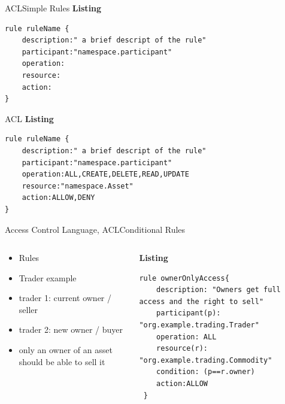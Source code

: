 \documentclass[pdf,table]{beamer}
\begin{document}
\begin{frame}[fragile]{ACL}{Simple Rules}
			{\bf Listing}
			\begin{lstlisting}[language=ACL, basicstyle=\ttfamily\normalsize]
rule ruleName {
	description:" a brief descript of the rule"
	participant:"namespace.participant"
	operation:
	resource:
	action:
}
			\end{lstlisting}
\end{frame}	

\begin{frame}[fragile]{ACL}
	\textbf{Listing}
			\begin{lstlisting}[language=ACL, basicstyle=\ttfamily\normalsize]
rule ruleName {
	description:" a brief descript of the rule"
	participant:"namespace.participant"
	operation:ALL,CREATE,DELETE,READ,UPDATE
	resource:"namespace.Asset"
	action:ALLOW,DENY
}
		\end{lstlisting}
\end{frame}

\begin{frame}[fragile]{Access Control Language, ACL}{Conditional Rules}
	\begin{columns}[T]
		\begin{column}{0.48\textwidth}
			\begin{itemize}
				\item Rules
				\item Trader example
				\item trader 1: current owner / seller
				\item trader 2: new owner / buyer
				\item only an owner of an asset should be able to sell it
			\end{itemize}	
		\end{column}
		\begin{column}{0.48\textwidth}
			{\bf Listing}
			\begin{lstlisting}[language=ACL]
rule ownerOnlyAccess{
	description: "Owners get full access and the right to sell"
	participant(p): "org.example.trading.Trader"
	operation: ALL
	resource(r): "org.example.trading.Commodity"
	condition: (p==r.owner)
	action:ALLOW
 }
			\end{lstlisting}
		\end{column}
	\end{columns}	
\end{frame}
\end{document}
